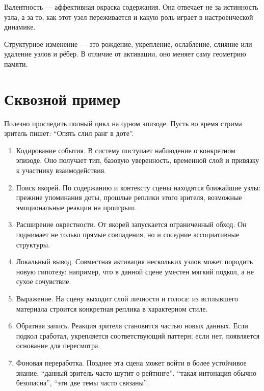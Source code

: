 \begin{definition}[Валентность]
Валентность --- аффективная окраска содержания. Она отвечает не за истинность
узла, а за то, как этот узел переживается и какую роль играет в настроенческой
динамике.
\end{definition}

\begin{definition}
Структурное изменение --- это рождение, укрепление, ослабление, слияние или
удаление узлов и рёбер. В отличие от активации, оно меняет саму геометрию
памяти.
\end{definition}

\section{Сквозной пример}

Полезно проследить полный цикл на одном эпизоде. Пусть во время стрима
зритель пишет: ``Опять слил ранг в доте''.

\begin{workedbox}
\begin{enumerate}
\item Кодирование события. В систему поступает наблюдение о конкретном эпизоде. Оно получает тип, базовую уверенность, временной слой и привязку к участнику взаимодействия.
\item Поиск якорей. По содержанию и контексту сцены находятся ближайшие узлы: прежние упоминания доты, прошлые реплики этого зрителя, возможные эмоциональные реакции на проигрыш.
\item Расширение окрестности. От якорей запускается ограниченный обход. Он поднимает не только прямые совпадения, но и соседние ассоциативные структуры.
\item Локальный вывод. Совместная активация нескольких узлов может породить новую гипотезу: например, что в данной сцене уместен мягкий подкол, а не сухое сочувствие.
\item Выражение. На сцену выходит слой личности и голоса: из всплывшего материала строится конкретная реплика в характерном стиле.
\item Обратная запись. Реакция зрителя становится частью новых данных. Если подкол сработал, укрепляется соответствующий паттерн; если нет, появляется основание для пересмотра.
\item Фоновая переработка. Позднее эта сцена может войти в более устойчивое знание: ``данный зритель часто шутит о рейтинге'', ``такая интонация обычно безопасна'', ``эти две темы часто связаны''.
\end{enumerate}
\end{workedbox}

